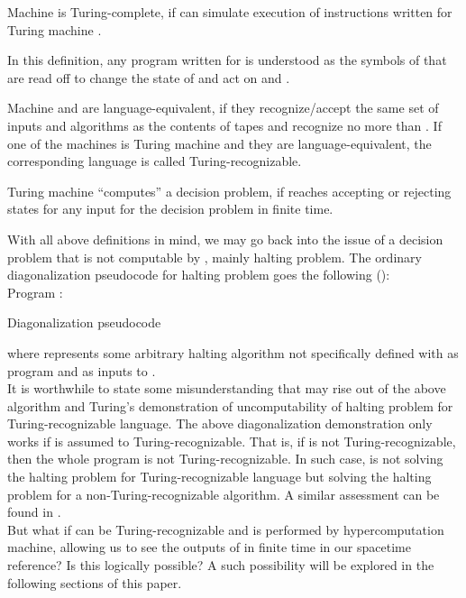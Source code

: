 \documentclass{roffin}
\begin{document}
\begin{definition}
Machine  is Turing-complete, if  can simulate execution of instructions written for Turing machine .
\end{definition}
In this definition, any program written for  is understood as the symbols of  that are read off to change the state of  and act on  and .
\begin{definition}
Machine  and  are language-equivalent, if they recognize/accept the same set  of inputs and algorithms as the contents of tapes and recognize no more than . If one of the machines is Turing machine  and they are language-equivalent, the corresponding language  is called Turing-recognizable. 
\end{definition}
\begin{definition}
Turing machine  ``computes'' a decision problem, if  reaches accepting or rejecting states for any input for the decision problem in finite time.
\end{definition}
With all above definitions in mind, we may go back into the issue of a decision problem that is not computable by , mainly halting problem. The ordinary diagonalization pseudocode for halting problem goes the following (\cite{penrose90}):\\

Program :\\
\begin{algorithm}[H]
 \caption{Diagonalization pseudocode}
\end{algorithm}
where  represents some arbitrary halting algorithm not specifically defined with  as program and  as inputs to .\\
It is worthwhile to state some misunderstanding that may rise out of the above algorithm and Turing's demonstration of uncomputability of halting problem for Turing-recognizable language. The above diagonalization demonstration only works if  is assumed to Turing-recognizable. That is, if  is not Turing-recognizable, then the whole program  is not Turing-recognizable. In such case,  is not solving the halting problem for Turing-recognizable language but solving the halting problem for a non-Turing-recognizable algorithm. A similar assessment can be found in \cite{ord05}.\\
But what if  can be Turing-recognizable and is performed by hypercomputation machine, allowing us to see the outputs of  in finite time in our spacetime reference? Is this logically possible? A such possibility will be explored in the following sections of this paper.
\end{document}
